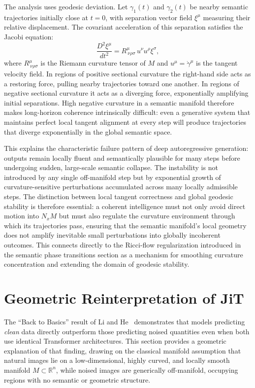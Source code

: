 \documentclass[11pt,a4paper,twocolumn]{article}
\begin{document}
The analysis uses geodesic deviation. Let $\gamma_1(t)$ and
$\gamma_2(t)$ be nearby semantic trajectories initially close at
$t = 0$, with separation vector field $\xi^\mu$ measuring their
relative displacement. The covariant acceleration of this separation
satisfies the Jacobi equation:
\[
\frac{D^2 \xi^\mu}{dt^2}
=
R^\mu_{\ \nu\rho\sigma}\,
u^\nu u^\rho \xi^\sigma,
\]
where $R^\mu_{\ \nu\rho\sigma}$ is the Riemann curvature tensor of
$M$ and $u^\mu = \dot{\gamma}^\mu$ is the tangent velocity field.
In regions of positive sectional curvature the right-hand side acts
as a restoring force, pulling nearby trajectories toward one another.
In regions of negative sectional curvature it acts as a diverging
force, exponentially amplifying initial separations. High negative
curvature in a semantic manifold therefore makes long-horizon
coherence intrinsically difficult: even a generative system that
maintains perfect local tangent alignment at every step will produce
trajectories that diverge exponentially in the global semantic space.

This explains the characteristic failure pattern of deep autoregressive
generation: outputs remain locally fluent and semantically plausible
for many steps before undergoing sudden, large-scale semantic
collapse. The instability is not introduced by any single off-manifold
step but by exponential growth of curvature-sensitive perturbations
accumulated across many locally admissible steps. The distinction
between local tangent correctness and global geodesic stability is
therefore essential: a coherent intelligence must not only avoid
direct motion into $N_x M$ but must also regulate the curvature
environment through which its trajectories pass, ensuring that
the semantic manifold's local geometry does not amplify inevitable
small perturbations into globally incoherent outcomes. This connects
directly to the Ricci-flow regularization introduced in the semantic
phase transitions section as a mechanism for smoothing curvature
concentration and extending the domain of geodesic stability.


\section{Geometric Reinterpretation of JiT}

The ``Back to Basics'' result of Li and He~\cite{li2025backtobasics}
demonstrates that models predicting \emph{clean} data directly
outperform those predicting noised quantities even when both use
identical Transformer architectures. This section provides a geometric
explanation of that finding, drawing on the classical manifold
assumption that natural images lie on a low-dimensional, highly curved,
and locally smooth manifold $M \subset \mathbb{R}^n$, while noised
images are generically off-manifold, occupying regions with no semantic
or geometric structure.
\end{document}
